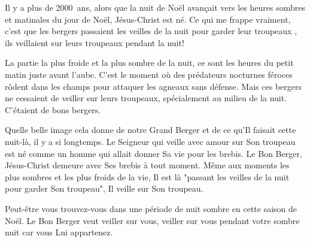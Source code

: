 

Il y a plus de 2000~ans, alors que la nuit de Noël avançait vers les heures sombres et matinales du jour de Noël, Jésus-Christ est né. Ce qui me frappe vraiment, c'est que les bergers \og passaient les veilles de la nuit pour garder leur troupeaux \fg{}, ils veillaient sur leurs troupeaux pendant la nuit!

La partie la plus froide et la plus sombre de la nuit, ce sont les heures du petit matin juste avant l'aube. C'est le moment où des prédateurs nocturnes féroces rôdent dans les champs pour attaquer les agneaux sans défense. Mais ces bergers ne cessaient de veiller sur leurs troupeaux, spécialement au milieu de la nuit. C'étaient de bons bergers.

Quelle belle image cela donne de notre Grand Berger et de ce qu'Il faisait cette nuit-là, il y a si longtemps. Le Seigneur qui veille avec amour sur Son troupeau est né comme un homme qui allait donner Sa vie pour les brebis. Le Bon Berger, Jésus-Christ demeure avec Ses brebis à tout moment. Même aux moments les plus sombres et les plus froids de la vie, Il est là "passant les veilles de la nuit pour garder Son troupeau", Il veille sur Son troupeau.

Peut-être vous trouvez-vous dans une période de nuit sombre en cette saison de Noël. Le Bon Berger veut veiller sur vous, veiller sur vous pendant votre sombre nuit car vous Lui appartenez.


